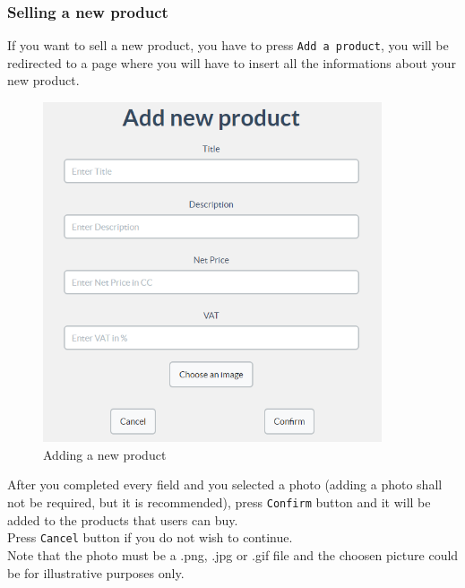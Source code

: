 		\subsubsection{Selling a new product}
		If you want to sell a new product, you have to press \texttt{Add a product}, you 
		will be redirected to a page where you will have to insert all the 
		informations about your new product.
		\begin{figure}[H]
			\includegraphics[width=10cm]{res/images/add_new_product.png}
			\centering
			\caption{Adding a new product}
		\end{figure}
		\noindent After you completed every field and you selected a photo 
		(adding a photo shall not be required, but it is recommended),
		press \texttt{Confirm} button and 
		it will be added to the products that users can buy.
		\\Press \texttt{Cancel} button if you do not wish to continue.
		\\Note that the photo must be a .png, .jpg or .gif file and the 
		 choosen picture could be for illustrative purposes only.
		 
